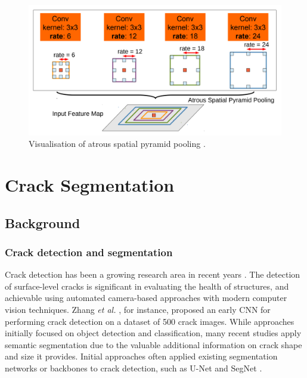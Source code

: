 \documentclass[a4paper,12pt]{report}
\begin{document}
\begin{figure}[ht]
    \centering
    \includegraphics[scale=0.5]{res/deeplab-aspp.png}
    \caption{Visualisation of atrous spatial pyramid pooling \cite{chen_deeplab_2017}.}
    \label{fig:deeplab_aspp}
\end{figure}

\chapter{Crack Segmentation}

\section{Background}
\subsection{Crack detection and segmentation}
Crack detection has been a growing research area in recent years \cite{hamishebahar_comprehensive_2022}. The detection of surface-level cracks is significant in evaluating the health of structures, and achievable using automated camera-based approaches with modern computer vision techniques. Zhang \textit{et al.} \cite{zhang_road_2016}, for instance, proposed an early CNN for performing crack detection on a dataset of 500 crack images. While approaches initially focused on object detection and classification, many recent studies apply semantic segmentation \cite{hamishebahar_comprehensive_2022} due to the valuable additional information on crack shape and size it provides. Initial approaches often applied existing segmentation networks or backbones to crack detection, such as U-Net \cite{david_jenkins_deep_2018} and SegNet \cite{chen_pavement_2020}.
\end{document}

